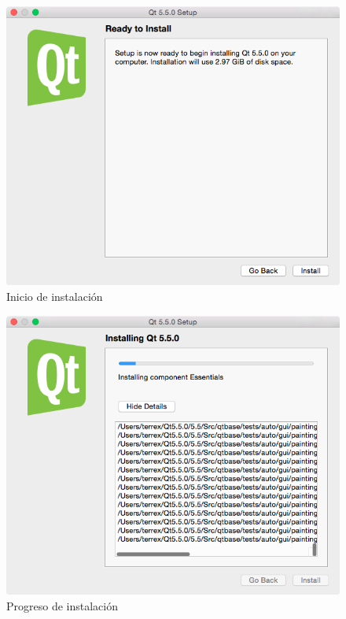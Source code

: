 \begin{figure}[htbp]
\centering
\includegraphics[width=11.5cm]{qt-5}
\caption{Inicio de instalación}
\label{fig:qt-5}
\end{figure}

\begin{figure}[htbp]
\centering
\includegraphics[width=11.5cm]{qt-6}
\caption{Progreso de instalación}
\label{fig:qt-6}
\end{figure}

